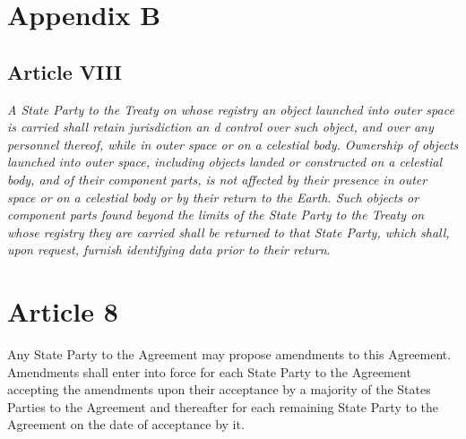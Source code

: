 \chapter{Appendix B}
\section{Article VIII}                  
\textit{A  State  Party  to  the  Treaty  on  whose  registry  an  object  launched  into  outer  
space  is  carried  shall  retain  jurisdiction  an
d  control  over  such  object,  and  over  any  
personnel  thereof,  while  in  outer  space  or  on  a  celestial  body.  Ownership  of  objects  
launched  into  outer  space,  including  objects  landed  or  constructed  on  a  celestial  
body,  and  of  their  component  parts,  is  not  affected  by  their  presence  in  outer  space  
or  on  a  celestial  body  or  by  their  return  to  the  Earth.  Such  objects  or  component  
parts  found  beyond  the  limits  of  the  State  Party  to  the  Treaty  on  whose  registry  they  
are  carried  shall  be  returned  to  that  State  Party,  which  shall,  upon  request,  furnish  
identifying data prior to their return\cite{lawApp}}. 

\chapter{Article 8}\label{ch:ArticleVIII}                    
Any  State  Party  to  the  Agreement  may  propose  amendments  to  this  Agreement.  
Amendments  shall  enter  into  force  for  
each  State  Party  to  the  Agreement  accepting  
the  amendments  upon  their  acceptance  by  a  majority  of  the  States  Parties  to  the  
Agreement  and  thereafter  for  each  remaining  State  Party  to  the  Agreement  on  the  
date of acceptance by it\cite{lawApp}.

